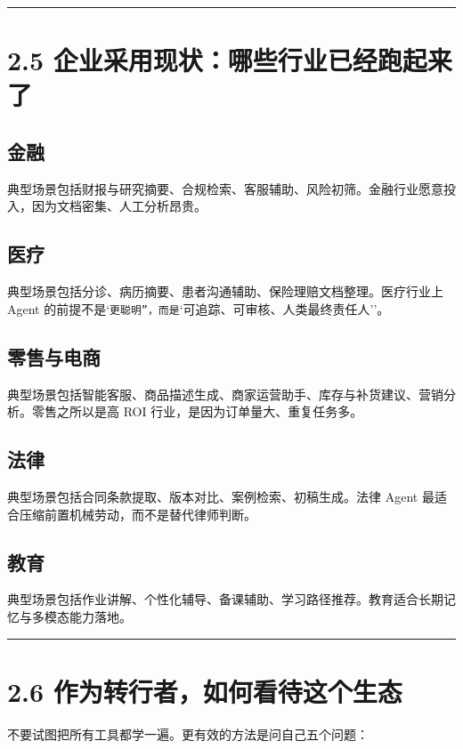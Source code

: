 \bigskip\hrule\bigskip

\section{2.5 企业采用现状：哪些行业已经跑起来了}

\subsection{金融}

典型场景包括财报与研究摘要、合规检索、客服辅助、风险初筛。金融行业愿意投入，因为文档密集、人工分析昂贵。


\subsection{医疗}

典型场景包括分诊、病历摘要、患者沟通辅助、保险理赔文档整理。医疗行业上 Agent 的前提不是`\texttt{更聪明''，而是}`可追踪、可审核、人类最终责任人''。


\subsection{零售与电商}

典型场景包括智能客服、商品描述生成、商家运营助手、库存与补货建议、营销分析。零售之所以是高 ROI 行业，是因为订单量大、重复任务多。


\subsection{法律}

典型场景包括合同条款提取、版本对比、案例检索、初稿生成。法律 Agent 最适合压缩前置机械劳动，而不是替代律师判断。


\subsection{教育}

典型场景包括作业讲解、个性化辅导、备课辅助、学习路径推荐。教育适合长期记忆与多模态能力落地。


\bigskip\hrule\bigskip

\section{2.6 作为转行者，如何看待这个生态}

不要试图把所有工具都学一遍。更有效的方法是问自己五个问题：


